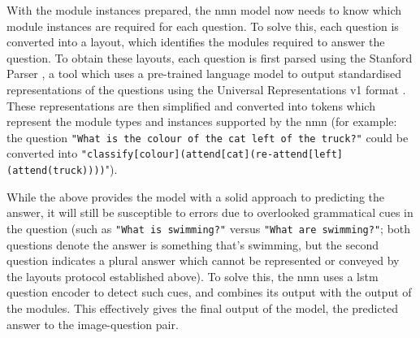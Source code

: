 With the module instances prepared, the \gls{nmn} model now needs to know which module instances are required for each question.
To solve this, each question is converted into a layout, which identifies the modules required to answer the question.
To obtain these layouts, each question is first parsed using the Stanford Parser \cite{klein_accurate_2003}, a tool which uses a pre-trained language model to output standardised representations of the questions using the Universal Representations v1 format \cite{nivre_universal_2016}.
These representations are then simplified and converted into tokens which represent the module types and instances supported by the \gls{nmn} (for example: the question \texttt{"What is the colour of the cat left of the truck?"} could be converted into \texttt{"classify[colour](attend[cat](re-attend[left](attend(truck))))}").

While the above provides the model with a solid approach to predicting the answer, it will still be susceptible to errors due to overlooked grammatical cues in the question (such as \texttt{"What is swimming?"} versus \texttt{"What are swimming?"}; both questions denote the answer is something that's swimming, but the second question indicates a plural answer which cannot be represented or conveyed by the layouts protocol established above).
To solve this, the \gls{nmn} uses a \acrlong{lstm} question encoder to detect such cues, and combines its output with the output of the modules.
This effectively gives the final output of the model, the predicted answer to the image-question pair.

